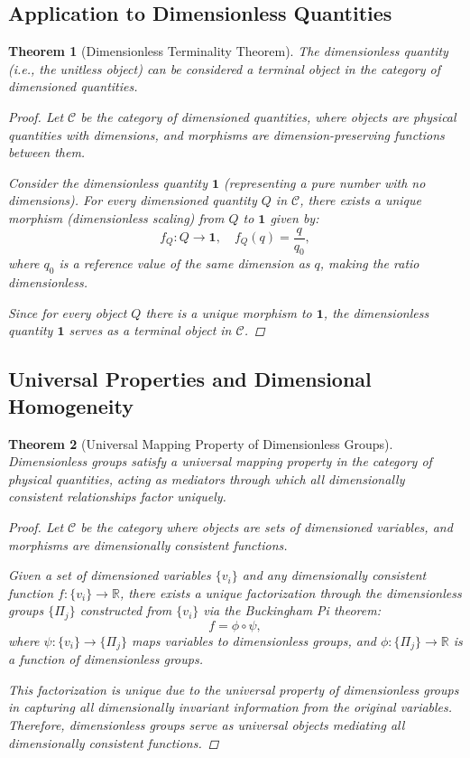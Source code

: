 \documentclass{article}
\newtheorem{theorem}{Theorem}[section]
\theoremstyle{definition}
\theoremstyle{remark}
\begin{document}
	\subsection{Application to Dimensionless Quantities}
	
	\begin{theorem}[Dimensionless Terminality Theorem]
		The dimensionless quantity (i.e., the unitless object) can be considered a terminal object in the category of dimensioned quantities.
		
		\begin{proof}
			Let $\mathcal{C}$ be the category of dimensioned quantities, where objects are physical quantities with dimensions, and morphisms are dimension-preserving functions between them.
			
			Consider the dimensionless quantity $\mathbf{1}$ (representing a pure number with no dimensions). For every dimensioned quantity $Q$ in $\mathcal{C}$, there exists a unique morphism (dimensionless scaling) from $Q$ to $\mathbf{1}$ given by:
			\[
			f_Q: Q \rightarrow \mathbf{1}, \quad f_Q(q) = \dfrac{q}{q_0},
			\]
			where $q_0$ is a reference value of the same dimension as $q$, making the ratio dimensionless.
			
			Since for every object $Q$ there is a unique morphism to $\mathbf{1}$, the dimensionless quantity $\mathbf{1}$ serves as a terminal object in $\mathcal{C}$.
		\end{proof}
	\end{theorem}
	
	\subsection{Universal Properties and Dimensional Homogeneity}
	
	\begin{theorem}[Universal Mapping Property of Dimensionless Groups]
		Dimensionless groups satisfy a universal mapping property in the category of physical quantities, acting as mediators through which all dimensionally consistent relationships factor uniquely.
		
		\begin{proof}
			Let $\mathcal{C}$ be the category where objects are sets of dimensioned variables, and morphisms are dimensionally consistent functions.
			
			Given a set of dimensioned variables $\{v_i\}$ and any dimensionally consistent function $f: \{v_i\} \rightarrow \mathbb{R}$, there exists a unique factorization through the dimensionless groups $\{\Pi_j\}$ constructed from $\{v_i\}$ via the Buckingham Pi theorem:
			\[
			f = \phi \circ \psi,
			\]
			where $\psi: \{v_i\} \rightarrow \{\Pi_j\}$ maps variables to dimensionless groups, and $\phi: \{\Pi_j\} \rightarrow \mathbb{R}$ is a function of dimensionless groups.
			
			This factorization is unique due to the universal property of dimensionless groups in capturing all dimensionally invariant information from the original variables. Therefore, dimensionless groups serve as universal objects mediating all dimensionally consistent functions.
		\end{proof}
	\end{theorem}
	
\end{document}
